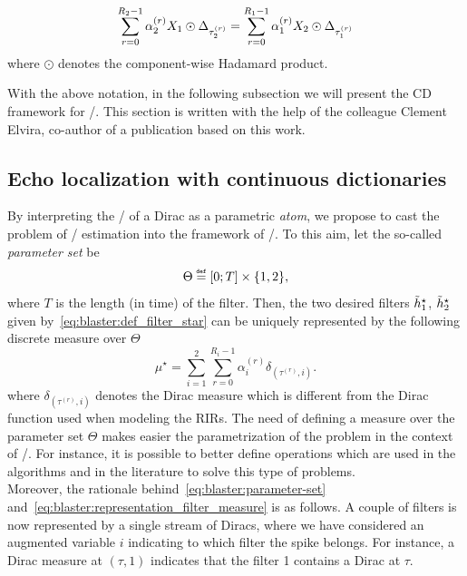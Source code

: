 \begin{equation}
    \label{eq:blaster:cross-relation-approx}
    \sum_{r=0}^{R_2-1} \alpha_2^{(r)} X_1 \odot \Delta_{\tau_{2}^{(r)}}
    =
    \sum_{r=0}^{R_1-1} \alpha_1^{(r)} X_2 \odot \Delta_{\tau_{1}^{(r)}}
\end{equation}
where $\odot$ denotes the component-wise Hadamard product.

\mynewline
With the above notation, in the following subsection we will present the \ac{CD} framework for \AER/.
This section is written with the help of the colleague Clement Elvira, co-author of a publication based on this work.

\subsection{Echo localization with continuous dictionaries}
By interpreting the \FT/ of a Dirac as a parametric \textit{atom}, we propose to cast the problem of \RIR/ estimation into the framework of \CD/.
To this aim, let the so-called \emph{parameter set} be
\begin{equation}
    \label{eq:blaster:parameter-set}
    \Theta \eqdef \kintervcc{0}{T} \times \kbrace{1, 2}
    ,
\end{equation}
where $T$ is the length (in time) of the filter.
Then, the two desired filters  $\tilde{h}_1^\star$, $\tilde{h}_2^\star$ given by~\cref{eq:blaster:def_filter_star} can be uniquely represented by the following discrete measure over $\Theta$
\begin{equation}
    \label{eq:blaster:representation_filter_measure}
    \mu^\star = \sum_{i=1}^{2} \sum_{r=0}^{R_{i}-1} \alpha_{i}^{(r)} \delta_{(\tau^{(r)}, i)}.
\end{equation}
where $\delta_{(\tau^{(r)}, i)}$ denotes the Dirac measure which is different from the Dirac function used when modeling the \acp{RIR}.
The need of defining a measure over the parameter set $\Theta$ makes easier the parametrization of the problem in the context of \CD/.
For instance, it is possible to better define operations which are used in the algorithms and in the literature to solve this type of problems.
\\Moreover, the rationale behind~\cref{eq:blaster:parameter-set} and~\cref{eq:blaster:representation_filter_measure} is as follows.
A couple of filters is now represented by a single stream of Diracs, where we have considered an augmented variable $i$ indicating to which filter the spike belongs.
For instance, a Dirac measure at $(\tau, 1)$ indicates that the filter 1 contains a Dirac at $\tau$.


